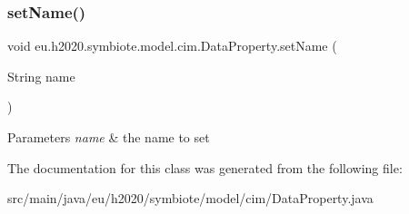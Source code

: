 \subsubsection{\texorpdfstring{set\+Name()}{setName()}}
{\footnotesize\ttfamily void eu.\+h2020.\+symbiote.\+model.\+cim.\+Data\+Property.\+set\+Name (\begin{DoxyParamCaption}\item[{String}]{name }\end{DoxyParamCaption})}


\begin{DoxyParams}{Parameters}
{\em name} & the name to set \\
\hline
\end{DoxyParams}


The documentation for this class was generated from the following file\+:\begin{DoxyCompactItemize}
\item 
src/main/java/eu/h2020/symbiote/model/cim/Data\+Property.\+java\end{DoxyCompactItemize}

